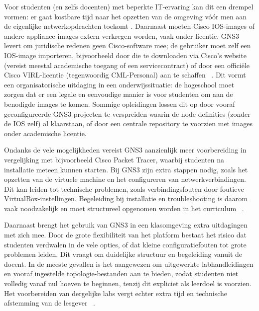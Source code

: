 \vspace{0.3cm}

Voor studenten (en zelfs docenten) met beperkte IT-ervaring kan dit een drempel vormen: er gaat kostbare tijd naar het opzetten van de omgeving vóór men aan de eigenlijke netwerkopdrachten toekomt \autocite{Amrizal2022}. Daarnaast moeten Cisco IOS-images of andere appliance-images extern verkregen worden, vaak onder licentie. GNS3 levert om juridische redenen geen Cisco-software mee; de gebruiker moet zelf een IOS-image importeren, bijvoorbeeld door die te downloaden via Cisco’s website (vereist meestal academische toegang of een servicecontract) of door een officiële Cisco VIRL-licentie (tegenwoordig CML-Personal) aan te schaffen ~\autocite{gns3_ios_images}. Dit vormt een organisatorische uitdaging in een onderwijssituatie: de hogeschool moet zorgen dat er een legale en eenvoudige manier is voor studenten om aan de benodigde images te komen. Sommige opleidingen lossen dit op door vooraf geconfigureerde GNS3-projecten te verspreiden waarin de node-definities (zonder de IOS zelf) al klaarstaan, of door een centrale repository te voorzien met images onder academische licentie.~\autocite{gns3_docs2025}

\vspace{0.3cm}

Ondanks de vele mogelijkheden vereist GNS3 aanzienlijk meer voorbereiding in vergelijking met bijvoorbeeld Cisco Packet Tracer, waarbij studenten na installatie meteen kunnen starten. Bij GNS3 zijn extra stappen nodig, zoals het opzetten van de virtuele machine en het configureren van netwerkverbindingen. Dit kan leiden tot technische problemen, zoals verbindingsfouten door foutieve VirtualBox-instellingen. Begeleiding bij installatie en troubleshooting is daarom vaak noodzakelijk en moet structureel opgenomen worden in het curriculum ~\autocite{gns3_docs2025}.

\vspace{0.3cm}

Daarnaast brengt het gebruik van GNS3 in een klasomgeving extra uitdagingen met zich mee. Door de grote flexibiliteit van het platform bestaat het risico dat studenten verdwalen in de vele opties, of dat kleine configuratiefouten tot grote problemen leiden. Dit vraagt om duidelijke structuur en begeleiding vanuit de docent. In de meeste gevallen is het aangewezen om uitgewerkte labhandleidingen en vooraf ingestelde topologie-bestanden aan te bieden, zodat studenten niet volledig vanaf nul hoeven te beginnen, tenzij dit expliciet als leerdoel is voorzien. Het voorbereiden van dergelijke labs vergt echter extra tijd en technische afstemming van de lesgever ~\autocite{gns3_docs2025}.

